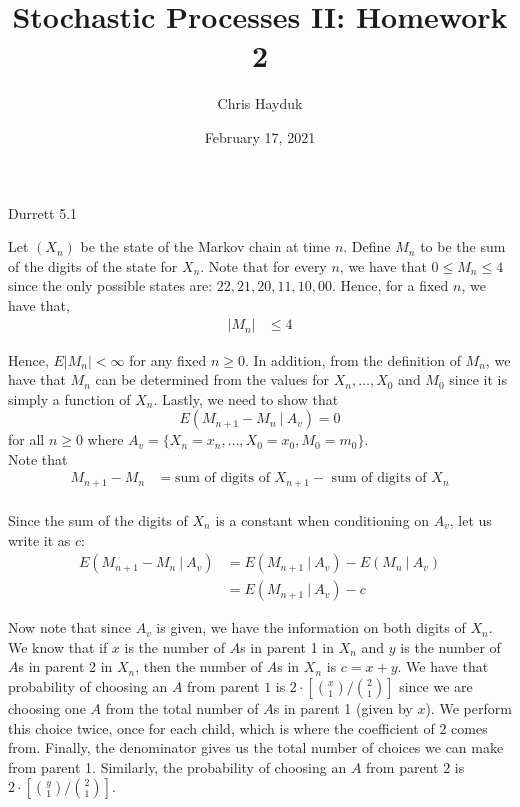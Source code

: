 \documentclass[12pt]{article}
\newenvironment{problem}[2][Problem]{\begin{trivlist}
\item[\hskip \labelsep {\bfseries #1}\hskip \labelsep {\bfseries #2.}]}{\end{trivlist}}
\begin{document}
\title{Stochastic Processes II: Homework 2}

\author{Chris Hayduk}
\date{February 17, 2021}

\maketitle

\begin{problem}{I}
Durrett 5.1
\end{problem}

Let $(X_n)$ be the state of the Markov chain at time $n$. Define $M_n$ to be the sum of the digits of the state for $X_n$. Note that for every $n$, we have that $0 \leq M_n \leq 4$ since the only possible states are: $22, 21, 20, 11, 10, 00$. Hence, for a fixed $n$, we have that,
\begin{align*}
|M_n| &\leq 4
\end{align*}

Hence, $E|M_n| < \infty$ for any fixed $n \geq 0$. In addition, from the definition of $M_n$, we have that $M_n$ can be determined from the values for $X_n, \ldots, X_0$ and $M_0$ since it is simply a function of $X_n$. Lastly, we need to show that $$E(M_{n+1} - M_n \ | \ A_v) = 0$$ for all $n \geq 0$ where $A_v = \{X_n = x_n, \ldots, X_0 = x_0, M_0 = m_0\}$.\\

Note that
\begin{align*}
M_{n+1} - M_n &= \text{sum of digits of } X_{n+1} - \text{ sum of digits of }X_n\\
\end{align*}

Since the sum of the digits of $X_n$ is a constant when conditioning on $A_v$, let us write it as $c$:
\begin{align*}
E(M_{n+1} - M_n \ | \ A_v) &= E(M_{n+1} \ | \ A_v) - E(M_n \ | \ A_v)\\
&= E(M_{n+1} \ | \ A_v) - c
\end{align*}

Now note that since $A_v$ is given, we have the information on both digits of $X_n$. We know that if $x$ is the number of $A$s in parent 1 in $X_n$ and $y$ is the number of $A$s in parent 2 in $X_n$, then the number of $A$s in $X_n$ is $c = x + y$. We have that probability of choosing an $A$ from parent $1$ is $2 \cdot \left[{x \choose 1}/{2 \choose 1}\right]$ since we are choosing one $A$ from the total number of $A$s in parent 1 (given by $x$). We perform this choice twice, once for each child, which is where the coefficient of $2$ comes from. Finally, the denominator gives us the total number of choices we can make from parent 1. Similarly, the probability of choosing an $A$ from parent $2$ is $2 \cdot \left[{y \choose 1}/{2 \choose 1}\right]$.\\
\end{document}
